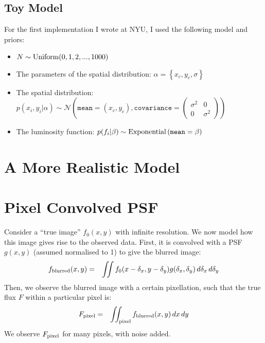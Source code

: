 \documentclass[letterpaper, 11pt]{article}
\begin{document}
\subsection{Toy Model}
For the first implementation I wrote at NYU, I used the following model and
priors:
\begin{itemize}
\item $N \sim \textnormal{Uniform}(0, 1, 2, ..., 1000)$ \\
\item The parameters of the spatial
distribution: $\alpha = \left\{x_c, y_c, \sigma\right\}$ \\
\item The spatial distribution: $p(x_i, y_i | \alpha)\sim\mathcal{N}\left(
\texttt{mean}=(x_c, y_c), \texttt{covariance}=
\left(\begin{array}{cc}\sigma^2 & 0 \\ 0 & \sigma^2\end{array}\right)\right)$ \\
\item The luminosity function: $p(f_i | \beta) \sim
\textnormal{Exponential}\left(\texttt{mean}=\beta\right)$
\end{itemize}



\section{A More Realistic Model}
\citep{2008ApJ...682..874K}

\appendix
\section{Pixel Convolved PSF}
Consider a ``true image'' $f_0(x, y)$ with infinite resolution. We now model how
this image gives rise to the observed data. First, it is convolved with a
PSF $g(x, y)$ (assumed normalised to 1) to give the blurred image:
\begin{eqnarray}
f_{\rm{blurred}}(x, y) &=& \iint f_0(x-\delta_x, y-\delta_y)
g(\delta_x, \delta_y) \, d\delta_x \, d\delta_y \label{blur}
\end{eqnarray}
Then, we observe the blurred image with a certain pixellation, such that
the true flux $F$ within a particular pixel is:
\begin{eqnarray}
F_{\rm{pixel}} &=& \iint_{\rm{pixel}} f_{\rm blurred}(x, y) \,dx\,dy
\label{pixel}
\end{eqnarray}
We observe $F_{\rm{pixel}}$ for many pixels, with noise added.
\end{document}
